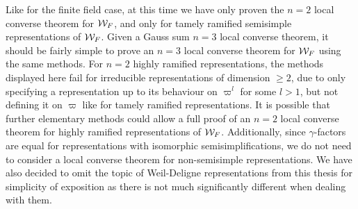 Like for the finite field case, at this time we have only proven the $n=2$ local converse theorem for $\mathcal{W}_F$, and only for tamely ramified semisimple representations of $\mathcal{W}_F$.
Given a Gauss sum $n=3$ local converse theorem, it should be fairly simple to prove an $n=3$ local converse theorem for $\mathcal{W}_F$ using the same methods.
For $n=2$ highly ramified representations, the methods displayed here fail for irreducible representations of dimension $\geq 2$, due to only specifying a representation up to its behaviour on $\varpi^l$ for some $l > 1$, but not defining it on $\varpi$ like for tamely ramified representations.
It is possible that further elementary methods could allow a full proof of an $n=2$ local converse theorem for highly ramified representations of $\mathcal{W}_F$.
Additionally, since $\gamma$-factors are equal for representations with isomorphic semisimplifications, we do not need to consider a local converse theorem for non-semisimple representations.
We have also decided to omit the topic of Weil-Deligne representations from this thesis for simplicity of exposition as there is not much significantly different when dealing with them.
\\
\endinput
